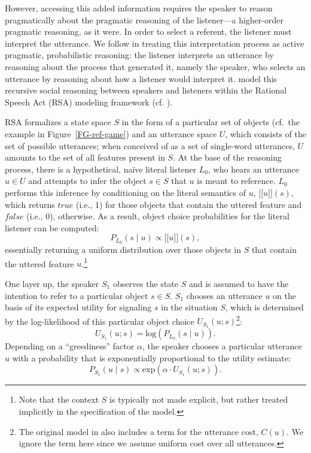 \documentclass[10pt,a4paper]{article}
\newcommand{\sem}[1]{\mbox{$[\![$#1$]\!]$}}
\begin{document}
However, accessing this added information requires the speaker to reason pragmatically about the pragmatic reasoning of the listener---a higher-order pragmatic reasoning, as it were.
In order to select a referent, the listener must interpret the utterance. We follow  in treating this interpretation process as active pragmatic, probabilistic reasoning: the listener interprets an utterance by reasoning about the process that generated it, namely the speaker, who selects an utterance by reasoning about how a listener would interpret it. \citeauthor{frankgoodman2012} model this recursive social reasoning between speakers and listeners within the Rational Speech Act (RSA) modeling framework (cf. ).

RSA formalizes a state space $S$ in the form of a particular set of objects (cf.~the example in Figure~\ref{FG-ref-game}) and an utterance space $U$, which consists of the set of possible utterances; when conceived of as a set of single-word utterances, $U$ amounts to the set of all features present in $S$. 
At the base of the reasoning process, there is a hypothetical, na\"ive literal listener $L_0$, who hears an utterance $u\in U$ and attempts to infer the object $s \in S$ that $u$ is meant to reference. 
$L_0$ performs this inference by conditioning on the literal semantics of $u$, \sem{$u$}$(s)$, which returns $true$ (i.e., 1) for those objects that contain the uttered feature and $false$ (i.e., 0), otherwise.
As a result, object choice probabilities for the literal listener can be computed:  
$$P_{L_{0}}(s\mid u) \propto \sem{$u$}(s),$$
essentially returning a uniform distribution over those objects in $S$ that contain the uttered feature $u$.\footnote{Note that the context $S$ is typically not made explicit, but rather treated implicitly in the specification of the model.}


One layer up, the speaker $S_1$ observes the state $S$ and is assumed to have the intention to refer to a particular object $s \in S$.
$S_1$ chooses an utterance $u$ on the basis of its expected utility for signaling $s$ in the situation $S$, which is determined by the log-likelihood of this particular object choice $U_{S_1}(u;s)$\footnote{The original model in  also includes a term for the utterance cost, $C(u)$. We ignore the term here since we assume uniform cost over all utterances.}:
$$U_{S_{1}}(u;s) = \textrm{log}(P_{L_{0}}(s \mid u)).$$ 
Depending on a ``greediness'' factor $\alpha$, the speaker chooses a particular utterance $u$ with a probability that is exponentially proportional to the utility estimate: 
$$P_{S_{1}} (u \mid s) \propto   \textrm{exp}(\alpha \cdot U_{S_{1}} (u;s)).$$
\end{document}
